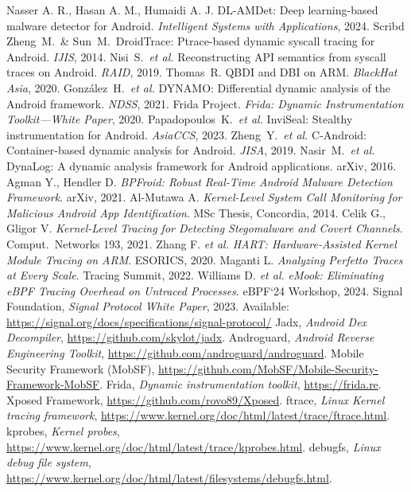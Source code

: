 \documentclass[a4paper,12pt]{report}
\begin{document}
\begin{thebibliography}{99}
    Nasser A. R., Hasan A. M., Humaidi A. J. DL-AMDet: Deep learning-based malware detector for Android. \textit{Intelligent Systems with Applications}, 2024. Scribd
     Zheng~M.\ \& Sun~M.\ DroidTrace: Ptrace-based dynamic syscall tracing for Android. \textit{IJIS}, 2014.
     Nisi~S.\ \emph{et al.} Reconstructing API semantics from syscall traces on Android. \textit{RAID}, 2019.
     Thomas~R. QBDI and DBI on ARM. \textit{BlackHat Asia}, 2020.
     González~H.\ \emph{et al.} DYNAMO: Differential dynamic analysis of the Android framework. \textit{NDSS}, 2021.
     Frida Project. \textit{Frida: Dynamic Instrumentation Toolkit—White Paper}, 2020.
     Papadopoulos~K.\ \emph{et al.} InviSeal: Stealthy instrumentation for Android. \textit{AsiaCCS}, 2023.
     Zheng~Y.\ \emph{et al.} C-Android: Container-based dynamic analysis for Android. \textit{JISA}, 2019.
     Nasir~M.\ \emph{et al.} DynaLog: A dynamic analysis framework for Android applications. arXiv, 2016.
     Agman Y., Hendler D. \emph{BPFroid: Robust Real-Time Android Malware Detection Framework}. arXiv, 2021.
     Al-Mutawa A. \emph{Kernel-Level System Call Monitoring for Malicious Android App Identification}. MSc Thesis, Concordia, 2014.
     Celik G., Gligor V. \emph{Kernel-Level Tracing for Detecting Stegomalware and Covert Channels}. Comput.\ Networks 193, 2021.
     Zhang F. \emph{et al.} \emph{HART: Hardware-Assisted Kernel Module Tracing on ARM}. ESORICS, 2020.
     Maganti L. \emph{Analyzing Perfetto Traces at Every Scale}. Tracing Summit, 2022.
     Williams D. \emph{et al.} \emph{eMook: Eliminating eBPF Tracing Overhead on Untraced Processes}. eBPF‘24 Workshop, 2024.
     Signal Foundation, \textit{Signal Protocol White Paper}, 2023. Available: \url{https://signal.org/docs/specifications/signal-protocol/}
 Jadx, \textit{Android Dex Decompiler}, \url{https://github.com/skylot/jadx}.
 Androguard, \textit{Android Reverse Engineering Toolkit}, \url{https://github.com/androguard/androguard}.
 Mobile Security Framework (MobSF), \url{https://github.com/MobSF/Mobile-Security-Framework-MobSF}.
 Frida, \textit{Dynamic instrumentation toolkit}, \url{https://frida.re}.
 Xposed Framework, \url{https://github.com/rovo89/Xposed}.
 ftrace, \textit{Linux Kernel tracing framework}, \url{https://www.kernel.org/doc/html/latest/trace/ftrace.html}.
 kprobes, \textit{Kernel probes}, \url{https://www.kernel.org/doc/html/latest/trace/kprobes.html}.
 debugfs, \textit{Linux debug file system}, \url{https://www.kernel.org/doc/html/latest/filesystems/debugfs.html}.


\end{thebibliography}
\end{document}
